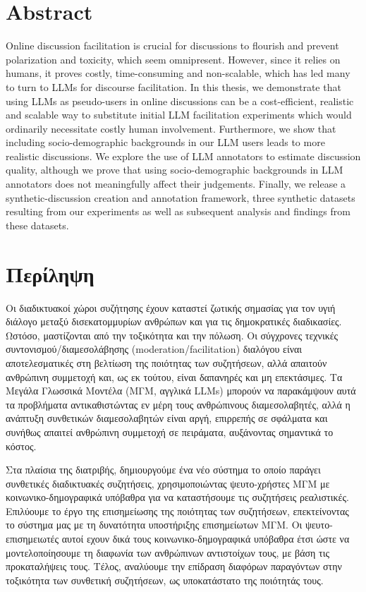 %

\chapter*{Abstract}
\label{sec:abstract}

Online discussion facilitation is crucial for discussions to flourish and prevent polarization and toxicity, which seem omnipresent. However, since it relies on humans, it proves costly, time-consuming and non-scalable, which has led many to turn to LLMs for discourse facilitation. In this thesis, we demonstrate that using LLMs as pseudo-users in online discussions can be a cost-efficient, realistic and scalable way to substitute initial LLM facilitation experiments which would ordinarily necessitate costly human involvement. Furthermore, we show that including socio-demographic backgrounds in our LLM users leads to more realistic discussions. We explore the use of LLM annotators to estimate discussion quality, although we prove that using socio-demographic backgrounds in LLM annotators does not meaningfully affect their judgements. Finally, we release a synthetic-discussion creation and annotation framework, three synthetic datasets resulting from our experiments as well as subsequent analysis and findings from these datasets.

\chapter*{Περίληψη}
\label{sec:abstract_greek}


Οι διαδικτυακοί χώροι συζήτησης έχουν καταστεί ζωτικής σημασίας για τον υγιή διάλογο μεταξύ δισεκατομμυρίων ανθρώπων και για τις δημοκρατικές διαδικασίες. Ωστόσο, μαστίζονται από την τοξικότητα και την πόλωση. Οι σύγχρονες τεχνικές συντονισμού/διαμεσολάβησης (moderation/facilitation) διαλόγου είναι αποτελεσματικές στη βελτίωση της ποιότητας των συζητήσεων, αλλά απαιτούν ανθρώπινη συμμετοχή και, ως εκ τούτου, είναι δαπανηρές και μη επεκτάσιμες. Τα Μεγάλα Γλωσσικά Μοντέλα (ΜΓΜ, αγγλικά LLMs) μπορούν να παρακάμψουν αυτά τα προβλήματα αντικαθιστώντας εν μέρη τους ανθρώπινους διαμεσολαβητές, αλλά η ανάπτυξη συνθετικών διαμεσολαβητών είναι αργή, επιρρεπής σε σφάλματα και συνήθως απαιτεί ανθρώπινη συμμετοχή σε πειράματα, αυξάνοντας σημαντικά το κόστος. 

Στα πλαίσια της διατριβής, δημιουργούμε ένα νέο σύστημα το οποίο παράγει συνθετικές διαδικτυακές συζητήσεις, χρησιμοποιώντας ψευτο-χρήστες ΜΓΜ με κοινωνικο-δημογραφικά υπόβαθρα για να καταστήσουμε τις συζητήσεις ρεαλιστικές. Επιλύουμε το έργο της επισημείωσης της ποιότητας των συζητήσεων, επεκτείνοντας το σύστημα μας με τη δυνατότητα υποστήριξης επισημείωτων ΜΓΜ. Οι ψευτο-επισημειωτές αυτοί εχουν δικά τους κοινωνικο-δημογραφικά υπόβαθρα έτσι ώστε να μοντελοποίησουμε τη διαφωνία των ανθρώπινων αντιστοίχων τους, με βάση τις προκαταλήψεις τους. Τέλος, αναλύουμε την επίδραση διαφόρων παραγόντων στην τοξικότητα των συνθετική συζητήσεων, ως υποκατάστατο της ποιότητάς τους. 

